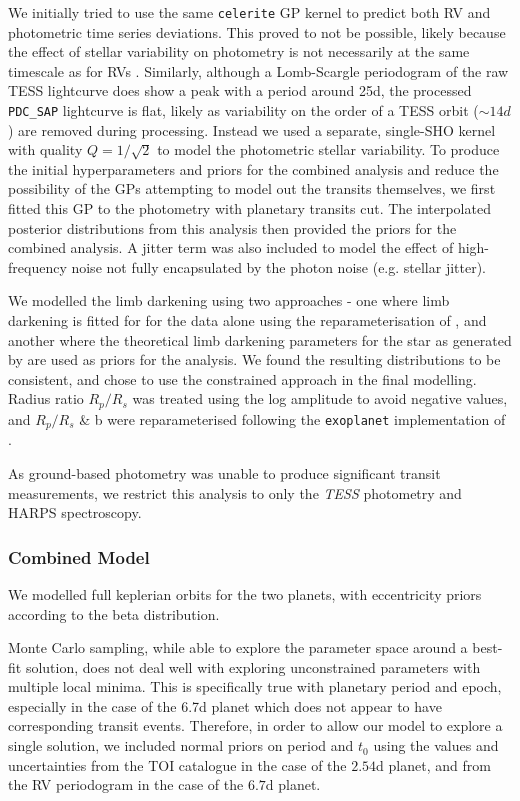 \documentclass[fleqn,usenatbib]{mnras}
\newcommand{\tess}{{\it TESS}}
\newcommand{\harps}{{HARPS}}
\begin{document}
We initially tried to use the same \texttt{celerite} GP kernel to predict both RV and photometric time series deviations.
This proved to not be possible, likely because the effect of stellar variability on photometry is not necessarily at the same timescale as for RVs \citep{10.1111/j.1365-2966.2011.19960.x}.
Similarly, although a Lomb-Scargle periodogram of the raw TESS lightcurve does show a peak with a period around 25d, the processed \texttt{PDC\_SAP} lightcurve is flat, likely as variability on  the order of a TESS orbit ($\sim 14d$) are removed during processing.
Instead we used a separate, single-SHO kernel with quality $Q=1/\sqrt{2}$ to model the photometric stellar variability.
To produce the initial hyperparameters and priors for the combined analysis and reduce the possibility of the GPs attempting to model out the transits themselves, we first fitted this GP to the photometry with planetary transits cut. The interpolated posterior distributions from this analysis then provided the priors for the combined analysis.
A jitter term was also included to model the effect of high-frequency noise not fully encapsulated by the photon noise (e.g. stellar jitter).

We modelled the limb darkening using two approaches - one where limb darkening is fitted for for the data alone using the reparameterisation of \citet{kipping2013efficient}, and another where the theoretical limb darkening parameters for the star as generated by \citet{claret2017limb} are used as priors for the analysis.
We found the resulting distributions to be consistent, and chose to use the constrained approach in the final modelling.
Radius ratio $R_p/R_s$ was treated using the log amplitude to avoid negative values, and $R_p/R_s$ \& b were reparameterised following the \texttt{exoplanet} implementation of \citet{espinoza2018efficient}.

As ground-based photometry was unable to produce significant transit measurements, we restrict this analysis to only the \tess{} photometry and \harps{} spectroscopy.

\subsubsection{Combined Model}
We modelled full keplerian orbits for the two planets, with eccentricity priors according to the \citet{kipping2013parametrizing} beta distribution.

Monte Carlo sampling, while able to explore the parameter space around a best-fit solution, does not deal well with exploring unconstrained parameters with multiple local minima. 
This is specifically true with planetary period and epoch, especially in the case of the 6.7d planet which does not appear to have corresponding transit events. 
Therefore, in order to allow our model to explore a single solution, we included normal priors on period and $t_0$ using the values and uncertainties from the TOI catalogue in the case of the $2.54$d planet, and from the RV periodogram in the case of the $6.7$d planet.
\end{document}
